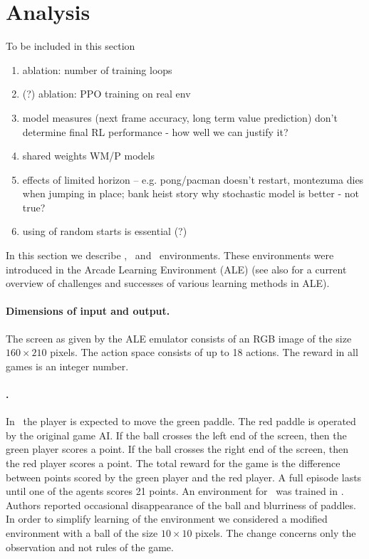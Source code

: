 \section{Analysis}

To be included in this section
\begin{enumerate}
    \item ablation: number of training loops
    \item (?) ablation: PPO training on real env
    \item model measures (next frame accuracy, long term value prediction) don't determine final RL performance - how well we can justify it?
    \item  shared weights WM/P models
    \item effects of limited horizon -- e.g. pong/pacman doesn't restart, montezuma dies when jumping in place;
    bank heist story why stochastic model is better - not true?
    \item using of random starts is essential (?)
\end{enumerate}

\label{envs}
\label{sec:envs}
In this section we describe \pong, \breakout\ and \freeway\ environments. These environments were introduced in the Arcade Learning Environment (ALE) \cite{ale} (see also \cite{ale2} for a current overview of challenges and successes of various learning methods in ALE). 

\paragraph{Dimensions of input and output.} The screen as given by the ALE emulator consists of an RGB image of the size $160\times 210$ pixels.  The action space consists of up to 18 actions. The reward in all games is an integer number.

\paragraph{\pong.} In \pong\ the player is expected to move the green paddle. The red paddle is operated by the original game AI. If the ball crosses the left end of the screen, then the green player scores a point. If the ball crosses the right end of the screen, then the red player scores a point. The total reward for the game is the difference between points scored by the green player and the red player. A full episode lasts until one of the agents scores 21 points. An environment for \pong\ was trained in \cite{recurrent}. Authors reported occasional disappearance of the ball and blurriness of paddles. In order to simplify learning of the environment we considered a modified environment with a ball of the size $10\times 10$ pixels. The change concerns only the observation and not rules of the game. 

